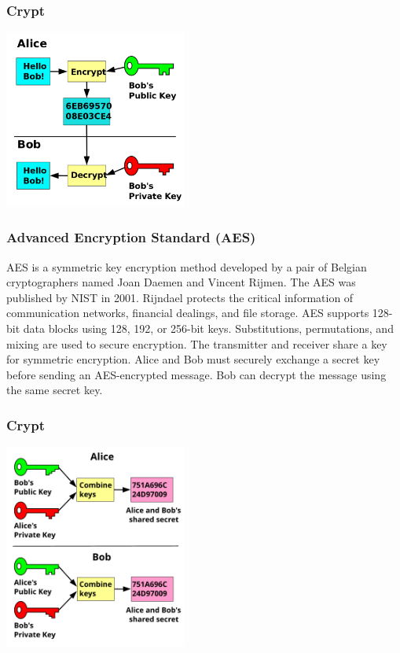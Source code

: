 \documentclass{beamer}
\begin{document}
\begin{frame}\frametitle{Crypt}
\begin{center}
\includegraphics[width=6cm]{fig/crypt2.png}
\end{center}
\end{frame}


\begin{frame}\frametitle{Advanced Encryption Standard (AES)}

AES is a symmetric key encryption method developed by a pair of Belgian cryptographers named Joan Daemen and Vincent Rijmen. The AES was published by NIST in 2001. Rijndael protects the critical information of communication networks, financial dealings, and file storage. AES supports 128-bit data blocks using 128, 192, or 256-bit keys. Substitutions, permutations, and mixing are used to secure encryption. The transmitter and receiver share a key for symmetric encryption. Alice and Bob must securely exchange a secret key before sending an AES-encrypted message. Bob can decrypt the message using the same secret key.
\end{frame}


\begin{frame}\frametitle{Crypt}
\begin{center}
\includegraphics[width=6cm]{fig/crypt3.png}
\end{center}
\end{frame}
\end{document}
